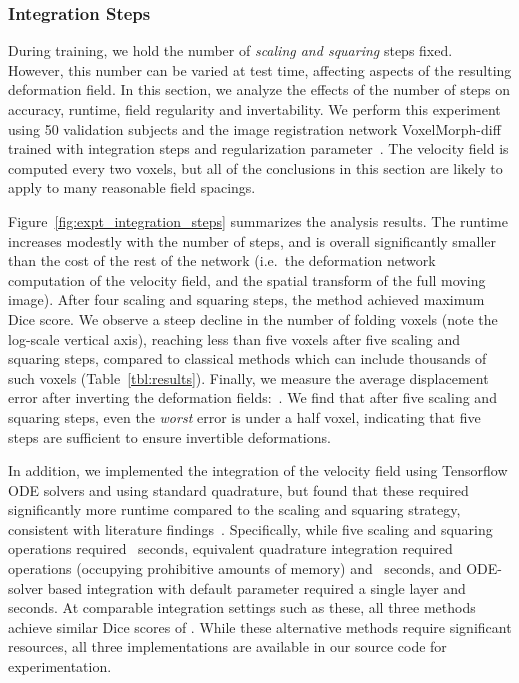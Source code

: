 \documentclass{article}
\newcommand{\citep}{\cite}
\begin{document}
\subsubsection{Integration Steps}


	
	During training, we hold the number of \textit{scaling and squaring} steps fixed. However, this number can be varied at test time, affecting aspects of the resulting deformation field. In this section, we analyze the effects of the number of steps on accuracy, runtime, field regularity and invertability. We perform this experiment using 50 validation subjects and the image registration network VoxelMorph-diff trained with  integration steps and regularization parameter~. The velocity field is computed every two voxels, but all of the conclusions in this section are likely to apply to many reasonable field spacings.
	
	Figure~\ref{fig:expt_integration_steps} summarizes the analysis results. The runtime increases modestly with the number of steps, and is overall significantly smaller than the cost of the rest of the network (i.e.\ the deformation network computation of the velocity field, and the spatial transform of the full moving image). After four scaling and squaring steps, the method achieved maximum Dice score. We observe a steep decline in the number of folding voxels (note the log-scale vertical axis), reaching less than five voxels after five scaling and squaring steps, compared to classical methods which can include thousands of such voxels (Table~\ref{tbl:results}). Finally, we measure the average displacement error after inverting the deformation fields:~. We find that after five scaling and squaring steps, even the \textit{worst} error is under a half voxel, indicating that five steps are sufficient to ensure invertible deformations.
	
{\color{blue} In addition, we implemented the integration of the velocity field using Tensorflow ODE solvers and using standard quadrature,	but found that these required significantly more runtime
	compared to the scaling and squaring strategy, consistent with 
	literature findings~\citep{arsigny2006,ashburner2007,modat2014global}.}  Specifically, while five scaling and squaring operations required~ seconds, equivalent quadrature integration required~ operations (occupying prohibitive amounts of memory) and~ seconds, and ODE-solver based integration with default parameter required a single layer and~ seconds. At comparable integration settings such as these, all three methods achieve similar Dice scores of . While these alternative methods require significant resources, all three implementations are available in our source code for experimentation.
	
\end{document}
